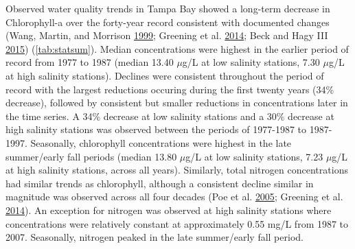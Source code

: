 \documentclass[]{article}
\begin{document}
Observed water quality trends in Tampa Bay showed a long-term decrease
in Chlorophyll-a over the forty-year record consistent with documented
changes (Wang, Martin, and Morrison
\protect\hyperlink{ref-Wang99}{1999}; Greening et al.
\protect\hyperlink{ref-Greening2014}{2014}; Beck and Hagy III
\protect\hyperlink{ref-Beck15}{2015}) (\cref{tab:statsum}). Median
concentrations were highest in the earlier period of record from 1977 to
1987 (median 13.40 \(\mu\)g/L at low salinity stations, 7.30 \(\mu\)g/L
at high salinity stations). Declines were consistent throughout the
period of record with the largest reductions occuring during the first
twenty years (34\% decrease), followed by consistent but smaller
reductions in concentrations later in the time series. A 34\% decrease
at low salinity stations and a 30\% decrease at high salinity stations
was observed between the periods of 1977-1987 to 1987-1997. Seasonally,
chlorophyll concentrations were highest in the late summer/early fall
periods (median 13.80 \(\mu\)g/L at low salinity stations, 7.23
\(\mu\)g/L at high salinity stations, across all years). Similarly,
total nitrogen concentrations had similar trends as chlorophyll,
although a consistent decline similar in magnitude was observed across
all four decades (Poe et al. \protect\hyperlink{ref-Poe05}{2005};
Greening et al. \protect\hyperlink{ref-Greening2014}{2014}). An
exception for nitrogen was observed at high salinity stations where
concentrations were relatively constant at approximately 0.55 mg/L from
1987 to 2007. Seasonally, nitrogen peaked in the late summer/early fall
period.
\end{document}
